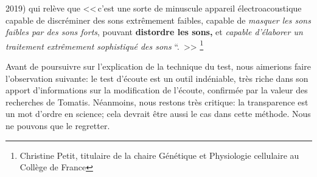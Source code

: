 2019)%
qui relève que 
<<\,c'est une sorte de minuscule appareil électroacoustique capable
de discréminer des sons extrêmement faibles, capable de \emph{masquer
	les sons faibles par des sons forts}, pouvant \textbf{distordre les
	sons,} et \emph{capable d'élaborer un traitement extrêmement
	sophistiqué des sons} ``. \,>> \autocite{petit_lookscience}   \footnote{Christine Petit, titulaire de la 
	chaire Génétique et
	Physiologie cellulaire au Collège de France}

Avant de poursuivre sur l'explication de la technique du test, nous aimerions faire l'observation suivante:
le test d'écoute est un outil indéniable, très riche dans son apport d'informations sur la modification de 
l'écoute, confirmée par la valeur des recherches de Tomatis. Néanmoins, nous restons très critique: la 
transparence est un mot d'ordre en science; cela devrait être aussi le cas dans cette méthode. 
Nous ne pouvons que le regretter.

 





